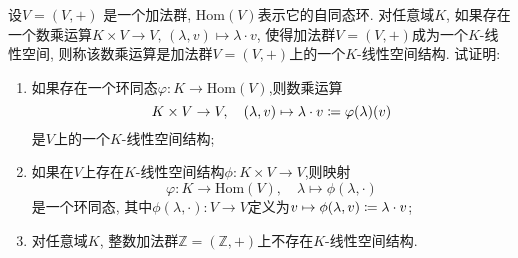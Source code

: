 \begin{problem}\label{ex:1.4.13}
    设$V = (V, +)$ 是一个加法群, $\mathrm{Hom}(V)$表示它的自同态环. 对任意域$K$, 如果存在一个数乘运算$K \times V \to V,\, (\lambda,v) \mapsto \lambda \cdot v$, 使得加法群$V = (V, +)$成为一个$K$-线性空间, 则称该数乘运算是加法群$V = (V, +)$上的一个$K$-线性空间结构. 试证明:
    \begin{enumerate}[(1)]
        \item 如果存在一个环同态$\varphi:K \to \mathrm{Hom}(V)$,则数乘运算
        \[
            K \times V \to V,\quad (\lambda, v) \mapsto \lambda \cdot v \mathrel{\coloneqq} \varphi(\lambda)(v)
        \]
        是$V$上的一个$K$-线性空间结构;
        \item 如果在$V$上存在$K$-线性空间结构$\phi:K \times V \to V$,则映射
        \[
            \varphi:K \to \mathrm{Hom}(V),\quad \lambda \mapsto \phi(\lambda, \cdot)
        \]
        是一个环同态, 其中$\phi(\lambda, \cdot):V \to V$定义为$v \mapsto \phi(\lambda, v) \mathrel{\coloneqq} \lambda \cdot v$;
        \item 对任意域$K$, 整数加法群$\mathbb{Z} = (\mathbb{Z}, +)$上不存在$K$-线性空间结构.
    \end{enumerate}
\end{problem}

